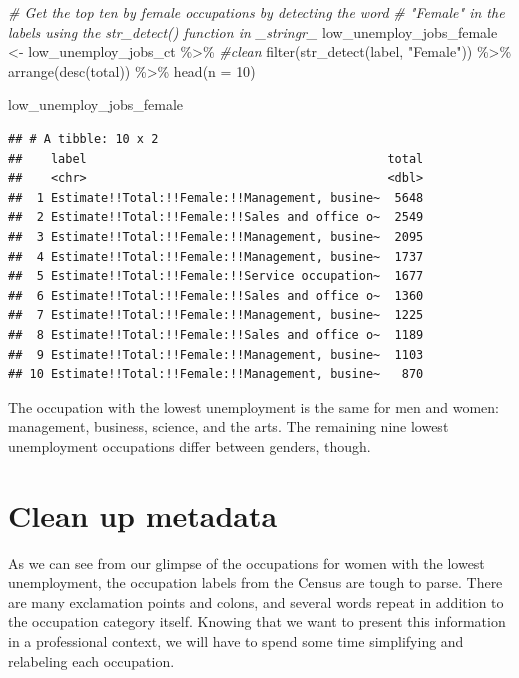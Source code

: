 \documentclass[
  krantz2]{krantz}
\makeatletter
\newenvironment{Shaded}{\begin{snugshade}}{\end{snugshade}}
\newcommand{\AttributeTok}[1]{\textcolor[rgb]{0.61,0.61,0.61}{#1}}
\newcommand{\CommentTok}[1]{\textcolor[rgb]{0.37,0.37,0.37}{\textit{#1}}}
\newcommand{\DecValTok}[1]{\textcolor[rgb]{0.06,0.06,0.06}{#1}}
\newcommand{\FunctionTok}[1]{\textcolor[rgb]{0,0,0}{#1}}
\newcommand{\NormalTok}[1]{#1}
\newcommand{\OtherTok}[1]{\textcolor[rgb]{0.37,0.37,0.37}{#1}}
\newcommand{\SpecialCharTok}[1]{\textcolor[rgb]{0,0,0}{#1}}
\newcommand{\StringTok}[1]{\textcolor[rgb]{0.5,0.5,0.5}{#1}}
\newenvironment{kframe}{%
\medskip{}
\setlength{\fboxsep}{.8em}
 \def\at@end@of@kframe{}%
 \ifinner\ifhmode%
  \def\at@end@of@kframe{\end{minipage}}%
  \begin{minipage}{\columnwidth}%
 \fi\fi%
 \def\FrameCommand##1{\hskip\@totalleftmargin \hskip-\fboxsep
 \colorbox{shadecolor}{##1}\hskip-\fboxsep
     \hskip-\linewidth \hskip-\@totalleftmargin \hskip\columnwidth}%
 \MakeFramed {\advance\hsize-\width
   \@totalleftmargin\z@ \linewidth\hsize
   \@setminipage}}%
 {\par\unskip\endMakeFramed%
 \at@end@of@kframe}
\renewenvironment{Shaded}{\begin{kframe}}{\end{kframe}}
\makeatother
\begin{document}
\begin{Shaded}
\begin{Highlighting}[]
\CommentTok{\# Get the top ten by female occupations by detecting the word}
\CommentTok{\# "Female" in the labels using the \textasciigrave{}str\_detect()\textasciigrave{} function in \_stringr\_}
\NormalTok{low\_unemploy\_jobs\_female }\OtherTok{\textless{}{-}}\NormalTok{ low\_unemploy\_jobs\_ct }\SpecialCharTok{\%\textgreater{}\%} \CommentTok{\#clean}
  \FunctionTok{filter}\NormalTok{(}\FunctionTok{str\_detect}\NormalTok{(label, }\StringTok{"Female"}\NormalTok{)) }\SpecialCharTok{\%\textgreater{}\%}
  \FunctionTok{arrange}\NormalTok{(}\FunctionTok{desc}\NormalTok{(total)) }\SpecialCharTok{\%\textgreater{}\%}
  \FunctionTok{head}\NormalTok{(}\AttributeTok{n =} \DecValTok{10}\NormalTok{)}

\NormalTok{low\_unemploy\_jobs\_female}
\end{Highlighting}
\end{Shaded}

\begin{verbatim}
## # A tibble: 10 x 2
##    label                                          total
##    <chr>                                          <dbl>
##  1 Estimate!!Total:!!Female:!!Management, busine~  5648
##  2 Estimate!!Total:!!Female:!!Sales and office o~  2549
##  3 Estimate!!Total:!!Female:!!Management, busine~  2095
##  4 Estimate!!Total:!!Female:!!Management, busine~  1737
##  5 Estimate!!Total:!!Female:!!Service occupation~  1677
##  6 Estimate!!Total:!!Female:!!Sales and office o~  1360
##  7 Estimate!!Total:!!Female:!!Management, busine~  1225
##  8 Estimate!!Total:!!Female:!!Sales and office o~  1189
##  9 Estimate!!Total:!!Female:!!Management, busine~  1103
## 10 Estimate!!Total:!!Female:!!Management, busine~   870
\end{verbatim}

The occupation with the lowest unemployment is the same for men and women: management, business, science, and the arts. The remaining nine lowest unemployment occupations differ between genders, though.

\hypertarget{clean-metadata}{%
\section{Clean up metadata}\label{clean-metadata}}

As we can see from our glimpse of the occupations for women with the lowest unemployment, the occupation labels from the Census are tough to parse. There are many exclamation points and colons, and several words repeat in addition to the occupation category itself. Knowing that we want to present this information in a professional context, we will have to spend some time simplifying and relabeling each occupation.
\end{document}
